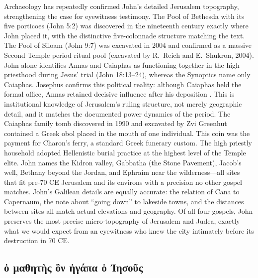 Archaeology has repeatedly confirmed John's detailed Jerusalem topography, strengthening the case for eyewitness testimony.
The Pool of Bethesda with its five porticoes (John 5:2) was discovered in the nineteenth century exactly where John placed it, with the distinctive five-colonnade structure matching the text.
The Pool of Siloam (John 9:7) was excavated in 2004 and confirmed as a massive Second Temple period ritual pool (excavated by R.~Reich and E.~Shukron, 2004).
John alone identifies Annas and Caiaphas as functioning together in the high priesthood during Jesus' trial (John 18:13--24), whereas the Synoptics name only Caiaphas.
Josephus confirms this political reality: although Caiaphas held the formal office, Annas retained decisive influence after his deposition \cite[18.26; 18.34--35]{josephus:ant}.
This is institutional knowledge of Jerusalem's ruling structure, not merely geographic detail, and it matches the documented power dynamics of the period.
The Caiaphas family tomb discovered in 1990 and excavated by Zvi Greenhut contained a Greek obol placed in the mouth of one individual.
This coin was the payment for Charon's ferry, a standard Greek funerary custom.
The high priestly household adopted Hellenistic burial practice at the highest level of the Temple elite.
John names the Kidron valley, Gabbatha (the Stone Pavement), Jacob's well, Bethany beyond the Jordan, and Ephraim near the wilderness---all sites that fit pre-70 CE Jerusalem and its environs with a precision no other gospel matches.
John's Galilean details are equally accurate: the relation of Cana to Capernaum, the note about ``going down'' to lakeside towns, and the distances between sites all match actual elevations and geography.
Of all four gospels, John preserves the most precise micro-topography of Jerusalem and Judea, exactly what we would expect from an eyewitness who knew the city intimately before its destruction in 70 CE.

\subsection{ὁ μαθητὴς ὃν ἠγάπα ὁ Ἰησοῦς}\label{subsec:ux1f41-ux3bcux3b1ux3b8ux3b7ux3c4ux1f74ux3c2-ux1f43ux3bd-ux1f20ux3b3ux3acux3c0ux3b1-ux1f41-ux1f30ux3b7ux3c3ux3bfux1fe6ux3c2}


